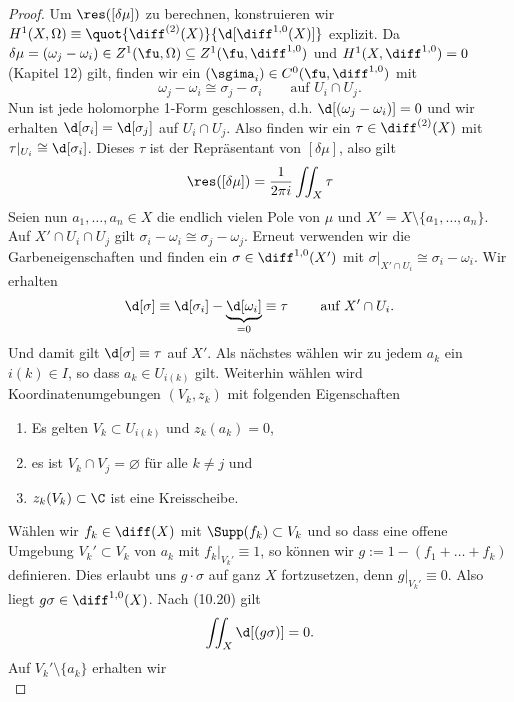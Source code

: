 \begin{proof}
  Um $\res([\delta \mu])$ zu berechnen, konstruieren wir $H^1(X,
  \Omega) \equiv \quot{\diff^{(2)}(X)}{\d[\diff^{1,0}(X)]}$
  explizit. Da $\delta \mu = (\omega_j - \omega_i) \in Z^1(\fu,
  \Omega) \subseteq Z^1(\fu, \diff^{1,0})$ und $H^1(X, \diff^{1,0}) =
  0$ (Kapitel 12) gilt, finden wir ein $(\sgima_i) \in C^0(\fu,
  \diff^{1,0})$ mit
  \[
  \omega_j - \omega_i \cong \sigma_j - \sigma_i \qquad \text{auf } U_i
  \cap U_j.
  \]
  Nun ist jede holomorphe 1-Form geschlossen, d.h. $\d[(\omega_j -
  \omega_i)] = 0$ und wir erhalten $\d[\sigma_i] = \d[\sigma_j]$ auf
  $U_i \cap U_j$. Also finden wir ein $ \tau \in \diff^{(2)}(X)$ mit
  $\tau|_{U_i} \cong \d[\sigma_i]$. Dieses $\tau$ ist der Repräsentant
  von $[\delta \mu]$, also gilt
  \[
  \res([\delta \mu]) = \frac{1}{2\pi i} \iint_X \tau
  \]
  Seien nun $a_1, \dots, a_n \in X$ die endlich vielen Pole von $\mu$
  und $X' = X \setminus \{a_1, \dots, a_n\}$. Auf $X' \cap U_i \cap
  U_j$ gilt $\sigma_i - \omega_i \cong \sigma_j - \omega_j$. Erneut
  verwenden wir die Garbeneigenschaften und finden ein $\sigma \in
  \diff^{1,0}(X')$ mit $\sigma|_{X' \cap U_i} \cong \sigma_i -
  \omega_i$. Wir erhalten
  \[
  \d[\sigma] \equiv \d[\sigma_i] - \underbrace{\d[\omega_i]}_{= 0} \equiv \tau
  \qquad \text{ auf } X' \cap U_i.
  \]
  Und damit gilt $\d[\sigma] \equiv \tau$ auf $X'$. Als nächstes
  wählen wir zu jedem $a_k$ ein $i(k) \in I$, so dass $a_k \in
  U_{i(k)}$ gilt. Weiterhin wählen wird Koordinatenumgebungen $(V_k,
  z_k)$ mit folgenden Eigenschaften
  \begin{enumerate}
  \item Es gelten $V_k \subset U_{i(k)}$ und $z_k(a_k) = 0$,
  \item es ist $V_k \cap V_j = \varnothing$ für alle $k \neq j$ und
  \item $z_k(V_k) \subset \C$ ist eine Kreisscheibe.
  \end{enumerate}
  Wählen wir $f_k \in \diff(X)$ mit $\Supp(f_k) \subset V_k$ und so
  dass eine offene Umgebung $V_k' \subset V_k$ von $a_k$ mit
  $f_k|_{V_k'} \equiv 1$, so können wir $g:= 1 - (f_1 + \dots + f_k)$
  definieren. Dies erlaubt uns $g \cdot \sigma$ auf ganz $X$
  fortzusetzen, denn $g|_{V_k'} \equiv 0$. Also liegt $g \sigma \in
  \diff^{1,0}(X)$. Nach (10.20) gilt
  \begin{align}
  \iint_X \d[(g \sigma)] = 0. \label{eq:g-sigma}
  \end{align}
  Auf $V_k' \setminus \{a_k\}$ erhalten wir
  \[
\]
\end{proof}
